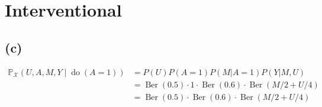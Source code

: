 \documentclass[10pt]{article}
\begin{document}



\section{Interventional}
\subsection{(c)}

\begin{align*}
\mathbb{P}_{\mathcal{X}}(U, A, M, Y \mid \operatorname{do}(A=1)) &=  P(U)P(A=1)P(M|A=1)P(Y|M, U)\\
&= \operatorname{Ber}(0.5)\cdot1\cdot\operatorname{Ber}(0.6)\cdot\operatorname{Ber}(M/2 + U/4)\\
&= \operatorname{Ber}(0.5)\cdot\operatorname{Ber}(0.6)\cdot\operatorname{Ber}(M/2 + U/4)
\end{align*}    
\end{document}
